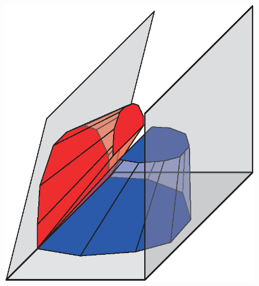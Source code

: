 \begin{figure} [htbp]
{\begin{minipage}[b]{0.23\textwidth}
      \includegraphics[scale=0.25]{figs/f6.illu-fru-intsct2.eps}
    \end{minipage}}
\end{figure}
